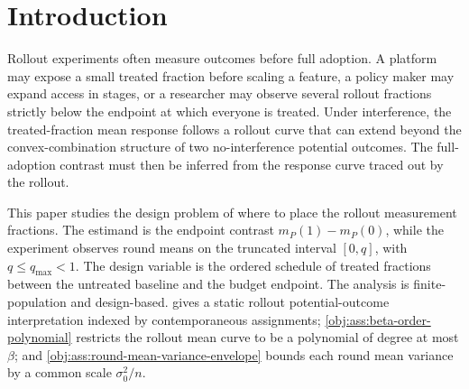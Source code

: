 \begin{abstract}
This paper studies how to place measurement rounds in a finite-population rollout experiment when the target is the full-adoption contrast but the rollout budget stops at a treated fraction \(q<1\). Under static rollout consistency, a degree-\(\beta\) polynomial restriction on the rollout mean curve, and a common round-mean variance envelope---restrictions that low-order interference motivates but that we impose rather than derive from a microfounded interference model---unbiased linear estimation reduces to a polynomial extrapolation problem from \([0,q]\) to \(1\). For a fixed schedule, the worst-case variance over the positive-semidefinite covariance class meeting this diagonal envelope equals the variance scale times the squared \(\ell^1\) (total-variation) norm of the polynomial-exact weights. The resulting diagonal-envelope amplification criterion, defined over linear unbiased estimators, attains its minimax value up to multiplicative constants at shifted Chebyshev-Lobatto measurement fractions when \(q\le q_{\max}<1\) and the number of rollout intervals satisfies \(k\ge c\beta\) for some \(c>1\). The minimax amplification is of order
\[
\left(\frac{(1+\sqrt{1-q})^2}{q}\right)^{2\beta},
\]
up to constants depending only on \(q_{\max}\) and the oversampling ratio. For the exact nested rollout covariance problem, the same Chebyshev schedule is rate-feasible through the envelope upper bound, and exact optimality under the true rollout covariance structure is posed as a separate covariance-specific design question.
\end{abstract}

\section{Introduction}
Rollout experiments often measure outcomes before full adoption. A platform may expose a small treated fraction before scaling a feature, a policy maker may expand access in stages, or a researcher may observe several rollout fractions strictly below the endpoint at which everyone is treated. Under interference, the treated-fraction mean response follows a rollout curve that can extend beyond the convex-combination structure of two no-interference potential outcomes. The full-adoption contrast must then be inferred from the response curve traced out by the rollout.

This paper studies the design problem of where to place the rollout measurement fractions. The estimand is the endpoint contrast \(m_P(1)-m_P(0)\), while the experiment observes round means on the truncated interval \([0,q]\), with \(q\le q_{\max}<1\). The design variable is the ordered schedule of treated fractions between the untreated baseline and the budget endpoint. The analysis is finite-population and design-based.  gives a static rollout potential-outcome interpretation indexed by contemporaneous assignments; \cref{obj:ass:beta-order-polynomial} restricts the rollout mean curve to be a polynomial of degree at most \(\beta\); and \cref{obj:ass:round-mean-variance-envelope} bounds each round mean variance by a common scale \(\sigma_0^2/n\).


